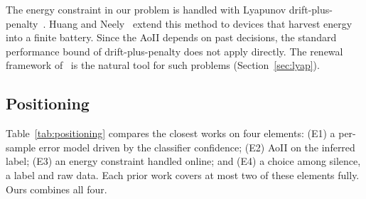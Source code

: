 \documentclass[5p,twocolumn]{elsarticle}
\theoremstyle{remark}
\begin{document}
The energy constraint in our problem is handled with Lyapunov drift-plus-penalty~\cite{neely2010book}. Huang and Neely~\cite{huang2013eh} extend this method to devices that harvest energy into a finite battery. Since the AoII depends on past decisions, the standard performance bound of drift-plus-penalty does not apply directly. The renewal framework of~\cite{neely2013renewal} is the natural tool for such problems (Section~\ref{sec:lyap}).

\subsection{Positioning}
Table~\ref{tab:positioning} compares the closest works on four elements: (E1) a per-sample error model driven by the classifier confidence; (E2) AoII on the inferred label; (E3) an energy constraint handled online; and (E4) a choice among silence, a label and raw data. Each prior work covers at most two of these elements fully. Ours combines all four.

\begin{table}[t]
\caption{Positioning against the closest works. \checkmark: covered; $\circ$: partly covered; --: not covered.}
\label{tab:positioning}
\centering\footnotesize
\setlength{\tabcolsep}{3pt}
\end{table}
\end{document}
